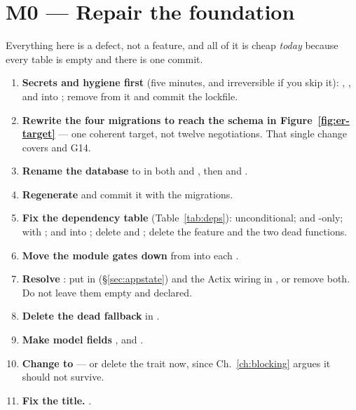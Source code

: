 \section{M0 --- Repair the foundation}

Everything here is a defect, not a feature, and all of it is cheap \emph{today} because every table
is empty and there is one commit.

\begin{runbook}[M0, in order]
\begin{enumerate}
  \item \textbf{Secrets and hygiene first} (five minutes, and irreversible if you skip it):
    , ,  and  into
    ; remove  from it and commit the lockfile.   
  \item \textbf{Rewrite the four migrations to reach the schema in
    Figure~\ref{fig:er-target}} --- one coherent target, not twelve negotiations. That single change
    covers         
        and G14.
  \item \textbf{Rename the database} to  in both  and
    , then  and .
  \item \textbf{Regenerate}  and commit it with the migrations.
  \item \textbf{Fix the dependency table} (Table~\ref{tab:deps}):  unconditional;
     and  -only;  with
    ;  and  into
    ; delete  and ; delete the  feature and
    the two dead  functions.       
  \item \textbf{Move the module gates down} from  into each
    . 
  \item \textbf{Resolve }: put  in
     (\S\ref{sec:appstate}) and the Actix wiring in , or
    remove both. Do not leave them empty and declared. 
  \item \textbf{Delete the dead  fallback} in . 
  \item \textbf{Make model fields }, and  .  
  \item \textbf{Change  to } --- or delete the trait now, since
    Ch.~\ref{ch:blocking} argues it should not survive. 
  \item \textbf{Fix the title.} .
\end{enumerate}
\end{runbook}

